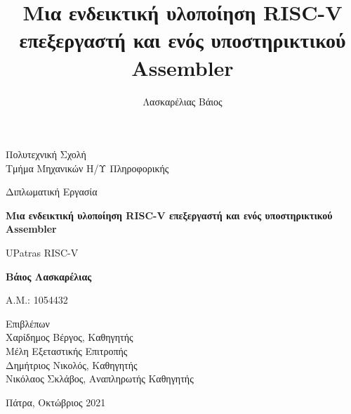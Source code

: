 \documentclass[11pt]{extarticle}
\title{Μια ενδεικτική υλοποίηση RISC-V επεξεργαστή και ενός υποστηρικτικού Assembler}
\author{Λασκαρέλιας Βάιος}
\begin{document}
\begin{titlepage}
    \begin{center}
        \vspace*{1cm}

        \newline

        {\Large Πολυτεχνική Σχολή\\
        Τμήμα Μηχανικών Η/Υ \textampersand\space Πληροφορικής\par}
        \vspace*{0.8cm}
        {\LARGE Διπλωματική Εργασία\par }
        \makebox[\textwidth][c]{
            \centering
            \rule{\textwidth}{0.4pt} }
        \hfill \newline
        \vspace*{0.3cm}
        \textbf{\Huge Μια ενδεικτική υλοποίηση RISC-V επεξεργαστή και ενός υποστηρικτικού Assembler} \par

        \vspace{0.5cm}

        {\huge UPatras RISC-V} \par
        \vspace*{0.3cm}
        \makebox[\textwidth][c]{
            \centering
            \rule{\textwidth}{0.4pt} }
        \hfill \newline
        \vspace{1cm}

        \textbf{\LARGE Βάιος Λασκαρέλιας}\par
        \vspace*{0.2cm}
        {\Large A.M.: 1054432} \par
        \vspace*{1.5cm}
        \Large
        Επιβλέπων\\\vspace*{0.2cm}
        Χαρίδημος Βέργος, Καθηγητής\\
        \vspace*{0.8cm}
        Μέλη Εξεταστικής Επιτροπής\\\vspace*{0.2cm}
        Δημήτριος Νικολός, Καθηγητής\\
        Νικόλαος Σκλάβος, Αναπληρωτής Καθηγητής\\
        \vfill
             
        Πάτρα, Οκτώβριος 2021
             
    \end{center}
 \end{titlepage}
\newpage
\end{document}
